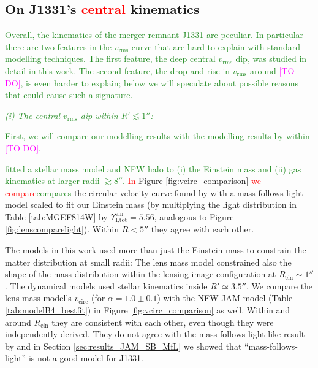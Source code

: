 \documentclass[useAMS,usenatbib]{mnras}
\newcommand{\Wilma}[1]{\textcolor{Magenta}{#1}}
\newcommand{\NEW}[1]{\textcolor{ForestGreen}{#1}}
\newcommand{\OLD}[1]{\textcolor{Red}{#1}}
\begin{document}
\subsection{On J1331's \OLD{central }kinematics}

\NEW{Overall, the kinematics of the merger remnant J1331 are peculiar. In particular there are two features in the $v_\text{rms}$ curve that are hard to explain with standard modelling techniques. The first feature, the deep central $v_\text{rms}$ dip, was studied in detail in this work. The second feature, the drop and rise in $v_\text{rms}$ around \Wilma{[TO DO]}, is even harder to explain; below we will speculate about possible reasons that could cause such a signature.}

\NEW{\emph{(i) The central $v_\text{rms}$ dip within $R'\lesssim1''$:}}

\NEW{First, we will compare our modelling results with the modelling results by \citet{SWELLSV} within \Wilma{[TO DO]}.}

\NEW{\citet{SWELLSV} fitted a stellar mass model and NFW halo to (i) the Einstein mass and (ii) gas kinematics at larger radii $\gtrsim8''$. } \OLD{In }Figure \ref{fig:vcirc_comparison} \OLD{we compare}\NEW{compares} the circular velocity curve found by \citet{SWELLSV} with a mass-follows-light model scaled to fit our Einstein mass (by multiplying the light distribution in Table \ref{tab:MGEF814W} by $\Upsilon_\text{I,tot}^\text{ein} = 5.56$, analogous to Figure \ref{fig:lenscomparelight}). Within $R < 5''$ they agree with each other. 

The models in this work used more than just the Einstein mass to constrain the matter distribution at small radii: The lens mass model constrained also the shape of the mass distribution within the lensing image configuration at $R_\text{ein} \sim 1''$. The dynamical models used stellar kinematics inside $R' \simeq 3.5''$. We compare the lens mass model's $v_\text{circ}$ (for $\alpha=1.0\pm 0.1$) with the NFW JAM model (Table \ref{tab:modelB4_bestfit}) in Figure \ref{fig:vcirc_comparison} as well. Within and around $R_\text{ein}$ they are consistent with each other, even though they were independently derived. They do not agree with the mass-follows-light-like result by \citet{SWELLSV} and in Section \ref{sec:results_JAM_SB_MfL} we showed that ``mass-follows-light'' is not a good model for J1331.
\end{document}
